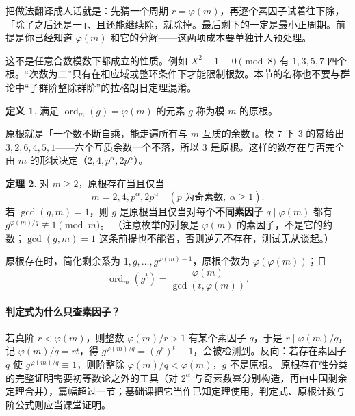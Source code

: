 \documentclass[UTF8,a4paper,11pt,twoside,openright,fontset=fandol]{ctexbook}
\theoremstyle{definition}
\newtheorem{definition}{定义}[chapter]
\newtheorem{theorem}[definition]{定理}
\newcommand{\ord}{\operatorname{ord}}
\begin{document}
\begin{tip}
把做法翻译成人话就是：先猜一个周期 $r=\varphi(m)$，再逐个素因子试着往下除，「除了之后还是一」、且还能继续除，就除掉。最后剩下的一定是最小正周期。前提是你已经知道 $\varphi(m)$ 和它的分解——这两项成本要单独计入预处理。
\end{tip}


\begin{pitfall}
这不是任意合数模数下都成立的性质。例如 $X^2-1\equiv0\pmod8$ 有 $1,3,5,7$ 四个根。“次数为二”只有在相应域或整环条件下才能限制根数。本节的名称也不要与群论中“子群阶整除群阶”的拉格朗日定理混淆。
\end{pitfall}


\begin{definition}
满足 $\ord_m(g)=\varphi(m)$ 的元素 $g$ 称为模 $m$ 的原根。
\end{definition}

\begin{tip}[原根一句话]
原根就是「一个数不断自乘，能走遍所有与 $m$ 互质的余数」。模 $7$ 下 $3$ 的幂给出 $3,2,6,4,5,1$——六个互质余数一个不落，所以 $3$ 是原根。这样的数存在与否完全由 $m$ 的形状决定（$2,4,p^\alpha,2p^\alpha$）。
\end{tip}

\begin{theorem}
对 $m\ge2$，原根存在当且仅当
\[
 m=2,4,p^\alpha,2p^\alpha\quad(p\text{ 为奇素数},\ \alpha\ge1).
\]
若 $\gcd(g,m)=1$，则 $g$ 是原根当且仅当对每个\textbf{不同素因子} $q\mid\varphi(m)$ 都有 $g^{\varphi(m)/q}\not\equiv1\pmod m$。
（注意枚举的对象是 $\varphi(m)$ 的素因子，不是它的约数；$\gcd(g,m)=1$ 这条前提也不能省，否则逆元不存在，测试无从谈起。）
\end{theorem}
原根存在时，简化剩余系为 $1,g,\ldots,g^{\varphi(m)-1}$，原根个数为 $\varphi(\varphi(m))$；且
\[
 \ord_m(g^t)=\frac{\varphi(m)}{\gcd(t,\varphi(m))}.
\]

\paragraph{判定式为什么只查素因子？}
若真阶 $r<\varphi(m)$，则整数 $\varphi(m)/r>1$ 有某个素因子 $q$，于是 $r\mid\varphi(m)/q$，记 $\varphi(m)/q=rt$，得 $g^{\varphi(m)/q}=(g^r)^t\equiv1$，会被检测到。反向：若存在素因子 $q$ 使 $g^{\varphi(m)/q}\equiv1$，则阶整除 $\varphi(m)/q<\varphi(m)$，$g$ 不是原根。
原根存在性分类的完整证明需要初等数论之外的工具（对 $2^\alpha$ 与奇素数幂分别构造，再由中国剩余定理合并），篇幅超过一节；基础课把它当作已知定理使用，判定式、原根计数与阶公式则应当课堂证明。
\end{document}
